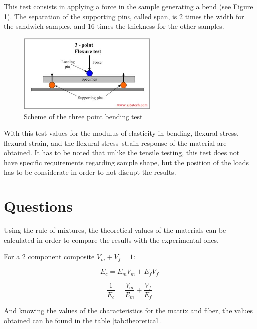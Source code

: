 This test consists in applying a force in the sample generating a bend (see Figure \ref{fig:3point_bending}).
The separation of the supporting pins, called span, is 2 times the width for the
sandwich samples, and 16 times the thickness for the other samples.


\begin{figure}[h]
	\centering
	\includegraphics[width=0.6\textwidth]{img/schema.png}
	\caption{Scheme of the three point bending test}
	\label{fig:3point_bending}
\end{figure}

With this test values for the modulus of elasticity in bending, flexural stress,
flexural strain, and the flexural stress–strain response of the material are obtained.
It has to be noted that unlike the tensile testing, this test does not have
specific requirements regarding sample shape, but the position of the loads
has to be considerate in order to not disrupt the results.

\clearpage

\section{Questions}

Using the rule of mixtures, the theoretical values of the materials can be
calculated in order to compare the results with the experimental ones.

For a 2 component composite $V_m + V_f = 1$:

\begin{equation}
	E_c = E_m V_m + E_f V_f
\end{equation}

\begin{equation}
	\frac{1}{E_c} = \frac{V_m}{E_m} + \frac{V_f}{E_f}
\end{equation}

And knowing the values of the characteristics for the matrix and fiber,
the values obtained can be found in the table \ref{tab:theoretical}.

